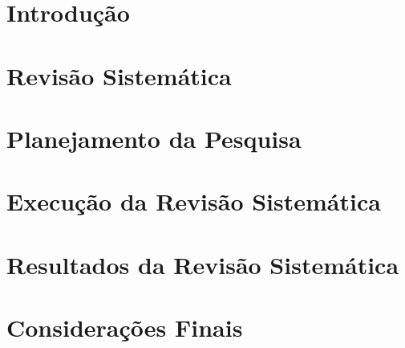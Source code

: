 \vspace{2cm}

\section{Introdução}


\section{Revisão Sistemática}


\vspace{1cm}
\section{Planejamento da Pesquisa}

\label{sec:planejamento}

\vspace{1cm}
\section{Execução da Revisão Sistemática}


\vspace{1cm}
\section{Resultados da Revisão Sistemática}


\vspace{1cm}
\section{Considerações Finais}

